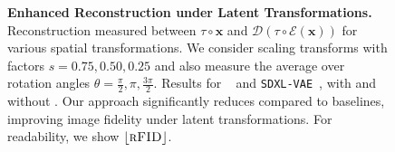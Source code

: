 \begin{figure}[ht]
    \caption{\textbf{Enhanced Reconstruction under Latent Transformations.} Reconstruction  measured between $\tau \circ \mathbf{x}$ and $ \mathcal{D}(\tau \circ \mathcal{E}(\mathbf{x}))$ for various spatial transformations. We consider scaling transforms with factors $s = 0.75, 0.50, 0.25$ and also measure the average   over rotation angles $\theta = \frac{\pi}{2}, \pi, \frac{3\pi}{2}$. Results for \sdvae~\cite{rombach2022high} and \texttt{SDXL-VAE}~\cite{podell2024sdxl}, with and without \our. Our approach significantly reduces  compared to baselines, improving image fidelity under latent transformations. For readability, we show $\left\lfloor{\textsc{rFID}}\right\rfloor$. }
    \label{fig:scales-rfig}
\end{figure}